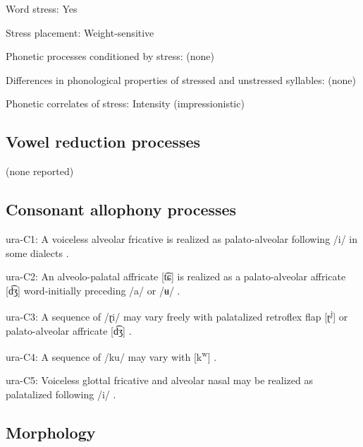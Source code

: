 {\begin{appendixdesc}
\item[Word stress:] Yes

\item[Stress placement:] Weight-sensitive

\item[Phonetic processes conditioned by stress:] (none)

\item[Differences in phonological properties of stressed and unstressed syllables:] (none)

\item[Phonetic correlates of stress:] Intensity (impressionistic)
\end{appendixdesc}
\subsection*{Vowel reduction processes}

(none reported)
\subsection*{Consonant allophony processes}
\begin{appendixdesc}

\item[ura-C1:] A voiceless alveolar fricative is realized as palato-alveolar following /i/ in some dialects \citep[38]{Olawsky2006}.

\item[ura-C2:] An alveolo-palatal affricate [t͡ɕ] is realized as a palato-alveolar affricate [d͡ʒ] word-initially preceding /a/ or /ʉ/ \citep[39]{Olawsky2006}.

\item[ura-C3:] A sequence of /ɽi/ may vary freely with palatalized retroflex flap [ɽ\textsuperscript{j}] or palato-alveolar affricate [d͡ʒ] \citep[71]{Olawsky2006}.

\item[ura-C4:] A sequence of /ku/ may vary with [k\textsuperscript{w}] \citep[37]{Olawsky2006}.

\item[ura-C5:] Voiceless glottal fricative and alveolar nasal may be realized as palatalized following /i/ \citep[47]{Olawsky2006}.
\end{appendixdesc}
\subsection*{Morphology}

}

